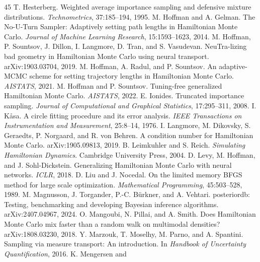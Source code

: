 \documentclass[11pt]{article}
\theoremstyle{remark}
\begin{document}
\begin{thebibliography}{45}
 T. Hesterberg. Weighted
average importance sampling and defensive mixture distributions.
\emph{Technometrics}, 37:185--194, 1995.
 M. Hoffman and
A. Gelman. The No-U-Turn Sampler: Adaptively setting path lengths in
Hamiltonian Monte Carlo. \emph{Journal of Machine Learning Research},
15:1593--1623, 2014.
 M. Hoffman, P. Sountsov,
J. Dillon, I. Langmore, D. Tran, and S. Vasudevan. NeuTra-lizing bad
geometry in Hamiltonian Monte Carlo using neural transport.
arXiv:1903.03704, 2019.
 M. Hoffman, A. Radul, and
P. Sountsov. An adaptive-MCMC scheme for setting trajectory lengths in
Hamiltonian Monte Carlo. \emph{AISTATS}, 2021.
 M. Hoffman and
P. Sountsov. Tuning-free generalized Hamiltonian Monte Carlo.
\emph{AISTATS}, 2022.
 E. Ionides. Truncated importance
sampling. \emph{Journal of Computational and Graphical Statistics},
17:295--311, 2008.
 I. K\r{a}sa. A circle fitting
procedure and its error analysis. \emph{IEEE Transactions on
Instrumentation and Measurement}, 25:8--14, 1976.
 I. Langmore, M. Dikovsky,
S. Geraedts, P. Norgaard, and R. von Behren. A condition number for
Hamiltonian Monte Carlo. arXiv:1905.09813, 2019.
 B. Leimkuhler and
S. Reich. \emph{Simulating Hamiltonian Dynamics}. Cambridge University
Press, 2004.
 D. Levy, M. Hoffman, and
J. Sohl-Dickstein. Generalizing Hamiltonian Monte Carlo with neural
networks. \emph{ICLR}, 2018.
 D. Liu and J. Nocedal. On the
limited memory BFGS method for large scale optimization.
\emph{Mathematical Programming}, 45:503--528, 1989.
 M. Magnusson,
J. Torgander, P.-C. B\"urkner, and A. Vehtari. posteriordb: Testing,
benchmarking and developing Bayesian inference algorithms.
arXiv:2407.04967, 2024.
 O. Mangoubi, N. Pillai,
and A. Smith. Does Hamiltonian Monte Carlo mix faster than a random walk
on multimodal densities? arXiv:1808.03230, 2018.
 Y. Marzouk, T. Moselhy,
M. Parno, and A. Spantini. Sampling via measure transport: An
introduction. In \emph{Handbook of Uncertainty Quantification}, 2016.
 K. Mengersen and

\end{thebibliography}
\end{document}
